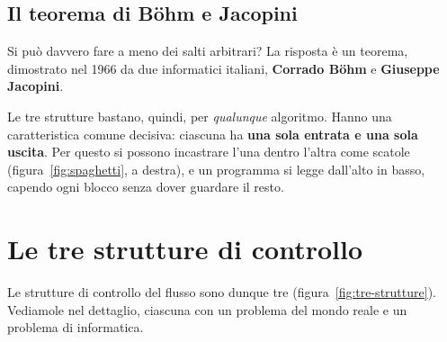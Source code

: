 \subsection{Il teorema di Böhm e Jacopini}

Si può davvero fare a meno dei salti arbitrari? La risposta è un teorema,
dimostrato nel 1966 da due informatici italiani, \textbf{Corrado Böhm} e
\textbf{Giuseppe Jacopini}.


Le tre strutture bastano, quindi, per \textit{qualunque} algoritmo. Hanno
una caratteristica comune decisiva: ciascuna ha \textbf{una sola entrata e
una sola uscita}. Per questo si possono incastrare l'una dentro l'altra
come scatole (figura~\ref{fig:spaghetti}, a destra), e un programma si
legge dall'alto in basso, capendo ogni blocco senza dover guardare il resto.


\section{Le tre strutture di controllo}

Le strutture di controllo del flusso sono dunque tre
(figura~\ref{fig:tre-strutture}). Vediamole nel dettaglio, ciascuna con un
problema del mondo reale e un problema di informatica.

